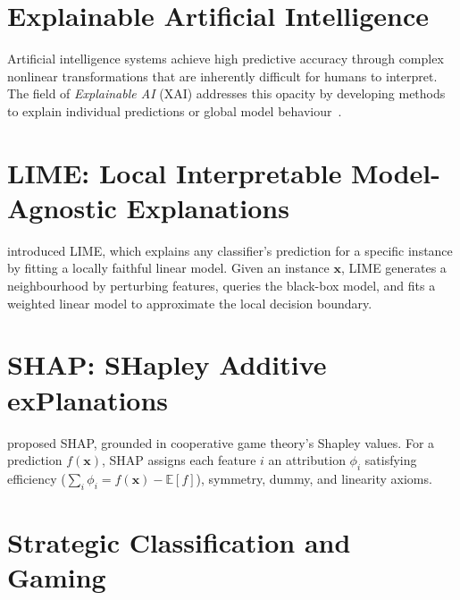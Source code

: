 \documentclass[12pt, a4paper, oneside]{report}
\theoremstyle{definition}
\begin{document}

\section{Explainable Artificial Intelligence}

Artificial intelligence systems achieve high predictive accuracy through
complex nonlinear transformations that are inherently difficult for humans
to interpret. The field of \textit{Explainable AI} (XAI) addresses this
opacity by developing methods to explain individual predictions or global
model behaviour~\citep{adadi2018peeking}.


\section{LIME: Local Interpretable Model-Agnostic Explanations}

\citet{ribeiro2016lime} introduced LIME, which explains any classifier's
prediction for a specific instance by fitting a locally faithful linear
model. Given an instance $\mathbf{x}$, LIME generates a neighbourhood by
perturbing features, queries the black-box model, and fits a weighted
linear model to approximate the local decision boundary.


\section{SHAP: SHapley Additive exPlanations}

\citet{lundberg2017shap} proposed SHAP, grounded in cooperative game theory's
Shapley values. For a prediction $f(\mathbf{x})$, SHAP assigns each feature $i$
an attribution $\phi_i$ satisfying efficiency ($\sum_i \phi_i = f(\mathbf{x}) - \mathbb{E}[f]$),
symmetry, dummy, and linearity axioms.


\section{Strategic Classification and Gaming}
\end{document}
